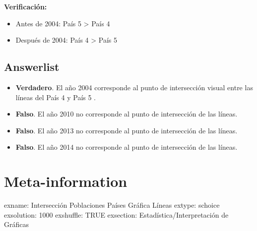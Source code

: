 \documentclass[
]{article}
\providecommand{\tightlist}{%
  \setlength{\itemsep}{0pt}\setlength{\parskip}{0pt}}
\begin{document}
\textbf{Verificación:}

\begin{itemize}
\tightlist
\item
  Antes de 2004: País 5 \textgreater{} País 4
\item
  Después de 2004: País 4 \textgreater{} País 5
\end{itemize}

\subsection{Answerlist}\label{answerlist-1}

\begin{itemize}
\tightlist
\item
  \textbf{Verdadero}. El año 2004 corresponde al punto de intersección
  visual entre las líneas del País 4 y País 5 .
\item
  \textbf{Falso}. El año 2010 no corresponde al punto de intersección de
  las líneas.
\item
  \textbf{Falso}. El año 2013 no corresponde al punto de intersección de
  las líneas.
\item
  \textbf{Falso}. El año 2014 no corresponde al punto de intersección de
  las líneas.
\end{itemize}

\section{Meta-information}\label{meta-information}

exname: Intersección Poblaciones Países Gráfica Líneas extype: schoice
exsolution: 1000 exshuffle: TRUE exsection: Estadística/Interpretación
de Gráficas
\end{document}
